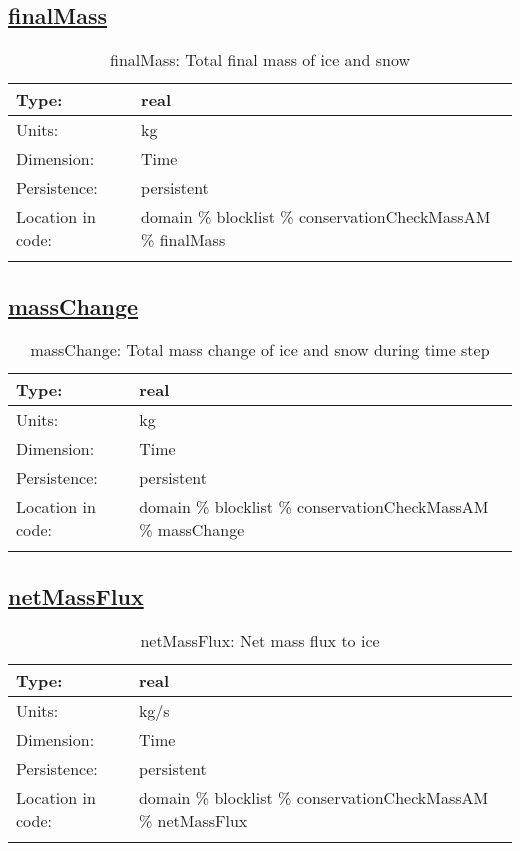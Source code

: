 \subsection[finalMass]{\hyperref[sec:var_tab_conservationCheckMassAM]{finalMass}}
\label{subsec:var_sec_conservationCheckMassAM_finalMass}
\begin{center}
\begin{longtable}{| p{2.0in} | p{4.0in} |}
        \hline 
        Type: & real \\
        \hline 
        Units: & \si{kg} \\
        \hline 
        Dimension: & Time \\
        \hline 
        Persistence: & persistent \\
        \hline 
         Location in code: & domain \% blocklist \% conservationCheckMassAM \% finalMass \\
         \hline 
    \caption{finalMass: Total final mass of ice and snow}
\end{longtable}
\end{center}
\subsection[massChange]{\hyperref[sec:var_tab_conservationCheckMassAM]{massChange}}
\label{subsec:var_sec_conservationCheckMassAM_massChange}
\begin{center}
\begin{longtable}{| p{2.0in} | p{4.0in} |}
        \hline 
        Type: & real \\
        \hline 
        Units: & \si{kg} \\
        \hline 
        Dimension: & Time \\
        \hline 
        Persistence: & persistent \\
        \hline 
         Location in code: & domain \% blocklist \% conservationCheckMassAM \% massChange \\
         \hline 
    \caption{massChange: Total mass change of ice and snow during time step}
\end{longtable}
\end{center}
\subsection[netMassFlux]{\hyperref[sec:var_tab_conservationCheckMassAM]{netMassFlux}}
\label{subsec:var_sec_conservationCheckMassAM_netMassFlux}
\begin{center}
\begin{longtable}{| p{2.0in} | p{4.0in} |}
        \hline 
        Type: & real \\
        \hline 
        Units: & \si{kg/s} \\
        \hline 
        Dimension: & Time \\
        \hline 
        Persistence: & persistent \\
        \hline 
         Location in code: & domain \% blocklist \% conservationCheckMassAM \% netMassFlux \\
         \hline 
    \caption{netMassFlux: Net mass flux to ice}
\end{longtable}
\end{center}
